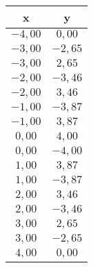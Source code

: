 \documentclass[8pt, a4paper]{article}
\begin{document}
\begin{enumerate}
\begin{table}[htbp]
		\label{tab:E11-10}
		\begin{tabular}{cc}
			\toprule
			\textbf{x} & \textbf{y} \\ 
			\midrule
			$-4,00$ & $0,00$ \\ 
			$-3,00$ & $-2,65$ \\ 
			$-3,00$ & $2,65$ \\ 
			$-2,00$ & $-3,46$ \\ 
			$-2,00$ & $3,46$ \\ 
			$-1,00$ & $-3,87$ \\ 
			$-1,00$ & $3,87$ \\ 
			$0,00$ & $4,00$ \\ 
			$0,00$ & $-4,00$ \\ 
			$1,00$ & $3,87$ \\ 
			$1,00$ & $-3,87$ \\ 
			$2,00$ & $3,46$ \\ 
			$2,00$ & $-3,46$ \\ 
			$3,00$ & $2,65$ \\ 
			$3,00$ & $-2,65$ \\ 
			$4,00$ & $0,00$ \\ 
			\bottomrule
		\end{tabular}
	\end{table}
\end{enumerate}
\end{document}
